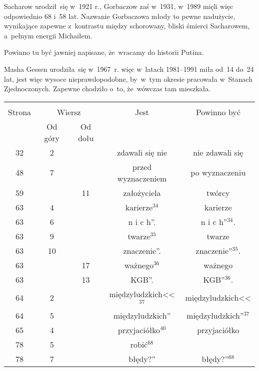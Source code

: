\documentclass[a4paper,11pt]{article}
\begin{document}
\vspace{\spaceFour}


\start {} Sacharow urodził~się w~1921 r., Gorbaczow zaś w~1931,
w~1989 mięli więc odpowiednio 68 i~58 lat. Nazwanie Gorbaczowa młody
to pewne nadużycie, wynikające zapewne z~kontrastu między schorowany,
bliski śmierci Sacharowem, a~pełnym energii Michaiłem.

\vspace{\spaceFour}


\start {}  Powinno tu być jawniej napisane,
że~wracamy do historii Putina.

\vspace{\spaceFour}


\start {} Masha Gessen
urodziła~się w~1967~r. więc w~latach 1981--1991 miła od~14 do~24 lat,
jest więc wysoce nieprawdopodobne, by~w~tym okresie pracowała
w~Stanach Zjednoczonych. Zapewne chodziło o~to, że~wówczas tam
mieszkała.


\begin{center}
  \begin{tabular}{|c|c|c|c|c|}
    \hline
    & \multicolumn{2}{c|}{} & & \\
    Strona & \multicolumn{2}{c|}{Wiersz} & Jest
                              & Powinno być \\ \cline{2-3}
    & Od góry & Od dołu & & \\
    \hline
    32 &  2 & & zdawali się nie & nie zdawali się \\
    48 &  7 & & przed wyznaczeniem & po wyznaczeniu \\
    59 & & 11 & założyciela & twórcy \\
    63 &  4 & & karierze$^{ 34 }$ & karierze \\
    63 &  6 & & n i c h''. & n i c h''$^{ 34 }$. \\
    63 &  9 & & twarze$^{ 35 }$ & twarze \\
    63 & 10 & & znaczenie''. & znaczenie''$^{ 35 }$. \\
    63 & & 17 & ważnego$^{ 36 }$ & ważnego \\
    63 & & 13 & KGB''. & KGB''$^{ 36 }$. \\
    64 &  2 & & międzyludzkich<<$^{ 37 }$ & międzyludzkich<< \\
    64 &  5 & & międzyludzkich'' & międzyludzkich''$^{ 37 }$ \\
    65 &  4 & & przyjaciółko$^{ 40 }$ & przyjaciółko \\
    78 &  5 & & robić$^{ 68 }$ & \\
    78 &  7 & & błędy?'' & błędy?''$^{ 68 }$ \\
    \hline
  \end{tabular}
\end{center}
\end{document}
